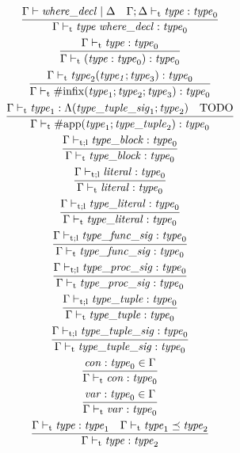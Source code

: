 \begin{gather*}
    \infer{\Gamma \vdash_\mathrm{t} \mathit{type}\; \mathit{where\_decl}: \mathit{type}_0}{
        \Gamma \vdash \mathit{where\_decl} \mid \Delta
        &
        \Gamma; \Delta \vdash_\mathrm{t} \mathit{type}: \mathit{type}_0
    }
    \\
    \infer{\Gamma \vdash_\mathrm{t} (\mathit{type}: \mathit{type}_0): \mathit{type}_0}{
        \Gamma \vdash_\mathrm{t} \mathit{type}: \mathit{type}_0
    }
    \\
    \infer{\Gamma \vdash_\mathrm{t} \mathrm{\#infix}(\mathit{type}_1; \mathit{type}_2; \mathit{type}_3): \mathit{type}_0}{
        \Gamma \vdash_\mathrm{t} \mathit{type}_2(\mathit{type_1}; \mathit{type}_3): \mathit{type}_0
    }
    \\
    \infer{\Gamma \vdash_\mathrm{t} \mathrm{\#app}(\mathit{type}_1; \mathit{type\_tuple}_2): \mathit{type}_0}{
        \Gamma \vdash_\mathrm{t} \mathit{type}_1: \Lambda(\mathit{type\_tuple\_sig}_1; \mathit{type}_2)
        &
        \text{TODO}
    }
    \\
    \infer{\Gamma \vdash_\mathrm{t} \mathit{type\_block}: \mathit{type}_0}{
        \Gamma \vdash_{\mathrm{t}; \mathrm{l}} \mathit{type\_block}: \mathit{type}_0
    }
    \\
    \infer{\Gamma \vdash_\mathrm{t} \mathit{literal}: \mathit{type}_0}{
        \Gamma \vdash_{\mathrm{t}; \mathrm{l}} \mathit{literal}: \mathit{type}_0
    }
    \\
    \infer{\Gamma \vdash_\mathrm{t} \mathit{type\_literal}: \mathit{type}_0}{
        \Gamma \vdash_{\mathrm{t}; \mathrm{l}} \mathit{type\_literal}: \mathit{type}_0
    }
    \\
    \infer{\Gamma \vdash_\mathrm{t} \mathit{type\_func\_sig}: \mathit{type}_0}{
        \Gamma \vdash_{\mathrm{t}; \mathrm{l}} \mathit{type\_func\_sig}: \mathit{type}_0
    }
    \\
    \infer{\Gamma \vdash_\mathrm{t} \mathit{type\_proc\_sig}: \mathit{type}_0}{
        \Gamma \vdash_{\mathrm{t}; \mathrm{l}} \mathit{type\_proc\_sig}: \mathit{type}_0
    }
    \\
    \infer{\Gamma \vdash_\mathrm{t} \mathit{type\_tuple}: \mathit{type}_0}{
        \Gamma \vdash_{\mathrm{t}; \mathrm{l}} \mathit{type\_tuple}: \mathit{type}_0
    }
    \\
    \infer{\Gamma \vdash_\mathrm{t} \mathit{type\_tuple\_sig}: \mathit{type}_0}{
        \Gamma \vdash_{\mathrm{t}; \mathrm{l}} \mathit{type\_tuple\_sig}: \mathit{type}_0
    }
    \\
    \infer{\Gamma \vdash_\mathrm{t} \mathit{con}: \mathit{type}_0}{
        \mathit{con}: \mathit{type}_0 \in \Gamma
    }
    \\
    \infer{\Gamma \vdash_\mathrm{t} \mathit{var}: \mathit{type}_0}{
        \mathit{var}: \mathit{type}_0 \in \Gamma
    }
    \\
    \infer{\Gamma \vdash_\mathrm{t} \mathit{type}: \mathit{type}_2}{
        \Gamma \vdash_\mathrm{t} \mathit{type}: \mathit{type}_1
        &
        \Gamma \vdash_\mathrm{t} \mathit{type}_1 \preceq \mathit{type}_2
    }
\end{gather*}


